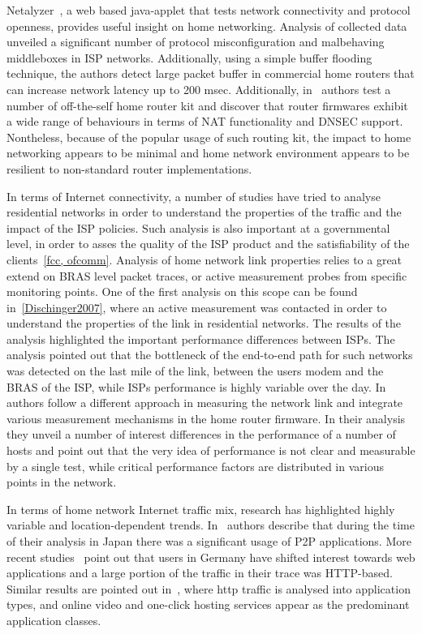 Netalyzer~\cite{Kreibich20}, a web based java-applet that tests network
connectivity and protocol openness, provides useful insight on home networking.
Analysis of collected data unveiled a significant number of protocol
misconfiguration and malbehaving middleboxes in ISP networks. Additionally,
using a simple buffer flooding technique, the authors detect large packet buffer
in commercial home routers that can increase network latency up to 200 msec.
Additionally, in~\cite{Hatonen10} authors test a number of off-the-self home
router kit and discover that router firmwares exhibit a wide range of behaviours
in terms of NAT functionality and DNSEC support. Nontheless, because of the
popular usage of such routing kit, the impact to home networking appears to be
minimal and home network environment appears to be resilient to non-standard
router implementations. 

In terms of Internet connectivity, a number of studies have tried to analyse
residential networks in order to understand the properties of the traffic and
the impact of the ISP policies. Such analysis is also important at a
governmental level, in order to asses the quality of the ISP product and the
satisfiability of the clients~\ref{fcc, ofcomm}. Analysis of home network link
properties relies to a great extend  on BRAS level packet traces, or active
measurement probes from specific monitoring points. One of the first analysis on
this scope can be found in~\ref{Dischinger2007}, where an active measurement was
contacted in order to understand the properties of the link in residential
networks. The results of the analysis highlighted the important performance
differences between ISPs. The analysis pointed out that the bottleneck of the
end-to-end path for such networks was detected on the last mile of the link,
between the users modem and the BRAS of the ISP, while ISPs performance is
highly variable over the day. In~\cite{Sundaresan2011} authors follow a
different approach in measuring the network link and integrate various
measurement mechanisms in the home router firmware. In their analysis they
unveil a number of interest differences in the performance of a number of hosts
and point out that the very idea of performance is not clear and measurable by a
single test, while critical performance factors are distributed in various
points in the network.  

In terms of home network Internet traffic mix, research has highlighted highly
variable and location-dependent trends. In~\cite{Cho2006} authors describe that
during the time of their analysis in Japan there was a significant usage of P2P
applications. More recent studies~\cite{Maier2009} point out that users in
Germany have shifted interest towards web applications and a large portion of
the traffic in their trace was HTTP-based. Similar results are pointed out
in~\cite{Erman2011}, where http traffic is analysed into application types, and
online video and one-click hosting services appear as the predominant
application classes. 

